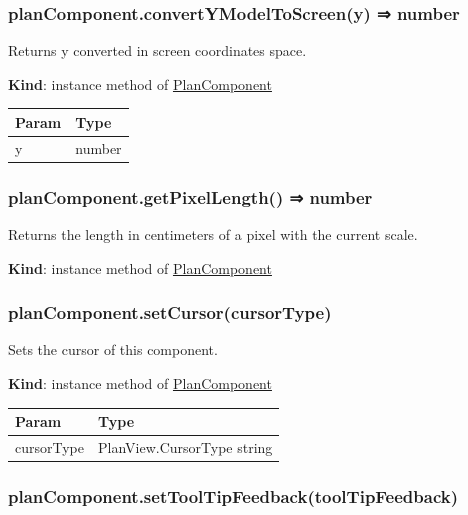 \documentclass[a4paper]{report}
\begin{document}
\hypertarget{plancomponent.convertymodeltoscreeny-number}{%
\subsubsection{planComponent.convertYModelToScreen(y) ⇒
number}\label{plancomponent.convertymodeltoscreeny-number}}

Returns y converted in screen coordinates space.

\textbf{Kind}: instance method of
\protect\hyperlink{PlanComponent}{PlanComponent}

\begin{longtable}[]{@{}ll@{}}
\toprule
Param & Type\tabularnewline
\midrule
\endhead
y & number\tabularnewline
\bottomrule
\end{longtable}

\hypertarget{plancomponent.getpixellength-number}{%
\subsubsection{planComponent.getPixelLength() ⇒
number}\label{plancomponent.getpixellength-number}}

Returns the length in centimeters of a pixel with the current scale.

\textbf{Kind}: instance method of
\protect\hyperlink{PlanComponent}{PlanComponent}\\

\hypertarget{plancomponent.setcursorcursortype}{%
\subsubsection{planComponent.setCursor(cursorType)}\label{plancomponent.setcursorcursortype}}

Sets the cursor of this component.

\textbf{Kind}: instance method of
\protect\hyperlink{PlanComponent}{PlanComponent}

\begin{longtable}[]{@{}ll@{}}
\toprule
Param & Type\tabularnewline
\midrule
\endhead
cursorType & PlanView.CursorType \textbar{} string\tabularnewline
\bottomrule
\end{longtable}

\hypertarget{plancomponent.settooltipfeedbacktooltipfeedback}{%
\subsubsection{planComponent.setToolTipFeedback(toolTipFeedback)}\label{plancomponent.settooltipfeedbacktooltipfeedback}}
\end{document}
